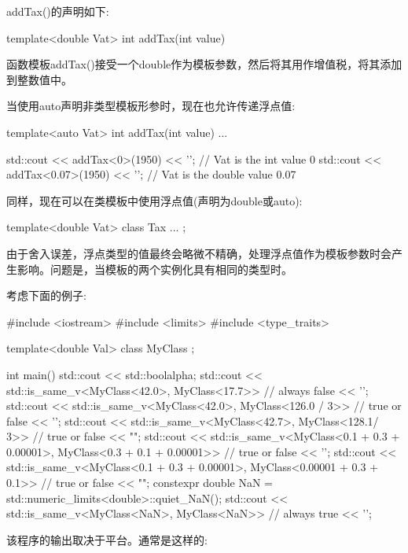 addTax()的声明如下:

\begin{cpp}
template<double Vat>
int addTax(int value)
\end{cpp}

函数模板addTax()接受一个double作为模板参数，然后将其用作增值税，将其添加到整数值中。

当使用auto声明非类型模板形参时，现在也允许传递浮点值:

\begin{cpp}
template<auto Vat>
int addTax(int value)
{
	...
}

std::cout << addTax<0>(1950) << '\n'; // Vat is the int value 0
std::cout << addTax<0.07>(1950) << '\n'; // Vat is the double value 0.07
\end{cpp}

同样，现在可以在类模板中使用浮点值(声明为double或auto):

\begin{cpp}
template<double Vat>
class Tax {
	...
};
\end{cpp}


由于舍入误差，浮点类型的值最终会略微不精确，处理浮点值作为模板参数时会产生影响。问题是，当模板的两个实例化具有相同的类型时。

考虑下面的例子:


\begin{cpp}
#include <iostream>
#include <limits>
#include <type_traits>

template<double Val>
class MyClass {
};

int main()
{
	std::cout << std::boolalpha;
	std::cout << std::is_same_v<MyClass<42.0>, MyClass<17.7>> // always false
			  << '\n';
	std::cout << std::is_same_v<MyClass<42.0>, MyClass<126.0 / 3>> // true or false
			  << '\n';
	std::cout << std::is_same_v<MyClass<42.7>, MyClass<128.1/ 3>> // true or false
			  << "\n\n";
	std::cout << std::is_same_v<MyClass<0.1 + 0.3 + 0.00001>,
	MyClass<0.3 + 0.1 + 0.00001>> // true or false
			  << '\n';
	std::cout << std::is_same_v<MyClass<0.1 + 0.3 + 0.00001>,
	MyClass<0.00001 + 0.3 + 0.1>> // true or false
			  << "\n\n";
	constexpr double NaN = std::numeric_limits<double>::quiet_NaN();
	std::cout << std::is_same_v<MyClass<NaN>, MyClass<NaN>> // always true
			  << '\n';
}
\end{cpp}

该程序的输出取决于平台。通常是这样的:

